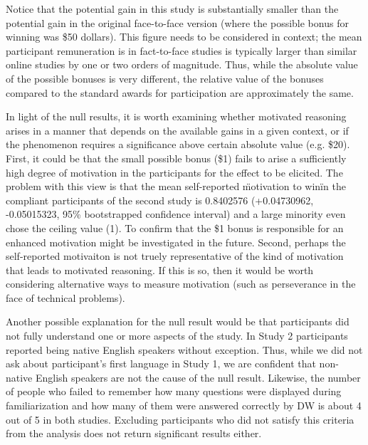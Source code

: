 \documentclass{article} \usepackage{apacite} \usepackage{graphicx} \usepackage{listings}
\begin{document}
Notice that the potential gain in this study is substantially smaller than the potential gain in the original face-to-face version (where the possible bonus for winning was \$50 dollars). This figure needs to be considered in context; the mean participant remuneration is in fact-to-face studies is typically larger than similar online studies by one or two orders of magnitude. Thus, while the absolute value of the possible bonuses is very different, the relative value of the bonuses compared to the standard awards for participation are approximately the same. 

In light of the null results, it is worth examining whether motivated reasoning arises in a manner that depends on the available gains in a given context, or if the phenomenon requires a significance above certain absolute value (e.g. \$20). First, it could be that the small possible bonus (\$1) fails to arise a sufficiently high degree of motivation in the participants for the effect to be elicited. The problem with this view is that the mean self-reported \"motivation to win\" in the compliant participants of the second study is 0.8402576 (+0.04730962, -0.05015323, 95\% bootstrapped confidence interval) and a large minority even chose the ceiling value (1). To confirm that the \$1 bonus is responsible for an enhanced motivation might be investigated in the future. Second, perhaps the self-reported motivaiton is not truely representative of the kind of motivation that leads to motivated reasoning. If this is so, then it would be worth considering alternative ways to measure motivation (such as perseverance in the face of technical problems).

Another possible explanation for the null result would be that participants did not fully understand one or more aspects of the study. In Study 2 participants reported being native English speakers without exception. Thus, while we did not ask about participant's first language in Study 1, we are confident that non-native English speakers are not the cause of the null result. Likewise, the number of people who failed to remember how many questions were displayed during familiarization and how many of them were answered correctly by DW is about 4 out of 5 in both studies. Excluding participants who did not satisfy this criteria from the analysis does not return significant results either. 
\end{document}

